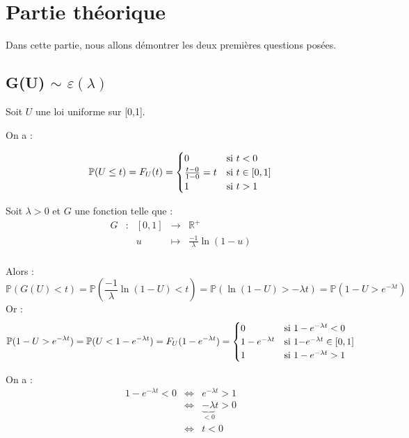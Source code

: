 \documentclass[12,french]{report}
\begin{document}
\chapter{Partie théorique}

Dans cette partie, nous allons démontrer les deux premières questions posées.

\section{G(U) $\sim$ $\varepsilon(\lambda)$}

Soit $U$ une loi uniforme sur [0,1].

On a :

$$\mathbb{P}(U\leq t)=F_{U}(t)=\begin{cases}
0 & \text{si \ensuremath{t<0} }\\
\frac{t-0}{1-0}=t & \text{si \ensuremath{t}}\in[0,1]\\
1 & \text{si \ensuremath{t>1}}
\end{cases}$$

Soit $\lambda>0$ et $G$ une fonction telle que : \\

$$\begin{array}{ccccc}
	G & : & [0,1] & \longrightarrow & \mathbb{R}^{+} \\
	& & u & \longmapsto & \frac{-1}{\lambda}\ln(1-u) \\
\end{array}$$

Alors : \\
$$\mathbb{P}(G(U)<t)=\mathbb{P}(\frac{-1}{\lambda}\ln(1-U)<t)=\mathbb{P}(\ln(1-U)>-\lambda t)=\mathbb{P}(1-U>e^{-\lambda t})$$
Or :
$$\mathbb{P}(1-U>e^{-\lambda t})=\mathbb{P}(U<1-e^{-\lambda t})=F_{U}(1-e^{-\lambda t})=\begin{cases}
0 & \text{si \ensuremath{1-e^{-\lambda t}<0}}\\
1-e^{-\lambda t} & \text{si \ensuremath{\ensuremath{1}-}\ensuremath{e^{-\lambda t}}}\in[0,1]\\
1 & \text{si \ensuremath{1-e^{-\lambda t}>1}}
\end{cases}$$

On a :
$$\begin{array}{ccl}
	1-e^{-\lambda t}<0 & \iff & e^{-\lambda t}>1 \\
					   & \iff & \underbrace{-\lambda}_{<0}t>0 \\
					   & \iff & t<0 \\
\end{array}$$\\
\end{document}
